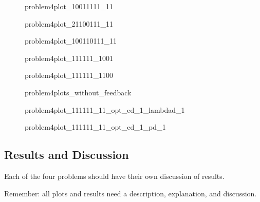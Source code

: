 \begin{figure}[htbp]
	\centering
	\caption{problem4plot\_10011111\_11}
	\label{fig:problem4plot_10011111_11}%
\end{figure}

\begin{figure}[htbp]
	\centering
	\caption{problem4plot\_21100111\_11}
	\label{fig:problem4plot_21100111_11}%
\end{figure}

\begin{figure}[htbp]
	\centering
	\caption{problem4plot\_100110111\_11}
	\label{fig:problem4plot_100110111_11}%
\end{figure}

\begin{figure}[htbp]
	\centering
	\caption{problem4plot\_111111\_1001}
	\label{fig:problem4plot_111111_1001}%
\end{figure}

\begin{figure}[htbp]
	\centering
	\caption{problem4plot\_111111\_1100}
	\label{fig:problem4plot_111111_1100}%
\end{figure}

\begin{figure}[htbp]
	\centering
	\caption{problem4plots\_without\_feedback}
	\label{fig:problem4plots_without_feedback}%
\end{figure}

\begin{figure}[htbp]
	\centering
	\caption{problem4plot\_111111\_11\_opt\_ed\_1\_lambdad\_1}
	\label{fig:problem4plot_111111_11_opt_ed_1_lambdad_1}%
\end{figure}

\begin{figure}[htbp]
	\centering
	\caption{problem4plot\_111111\_11\_opt\_ed\_1\_pd\_1}
	\label{fig:problem4plot_111111_11_opt_ed_1_pd_1}%
\end{figure}




\subsection{Results and Discussion}
Each of the four problems should have their own discussion of results. 

Remember: all plots and results need a description, explanation, and discussion.